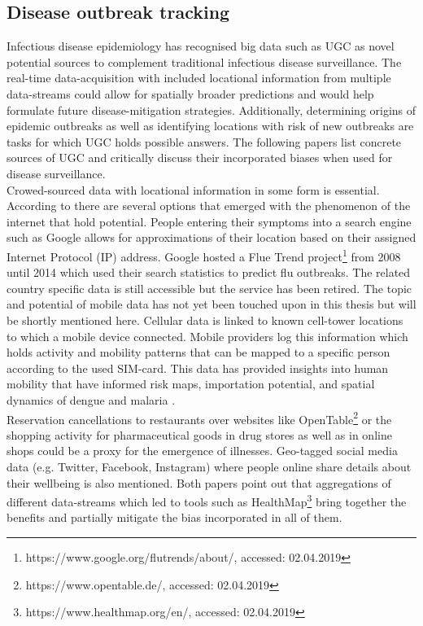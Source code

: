 \subsection{Disease outbreak tracking}
Infectious disease epidemiology has recognised big data such as UGC as novel potential sources to complement traditional infectious disease surveillance. The real-time data-acquisition with included locational information from multiple data-streams could allow for spatially broader predictions and would help formulate future disease-mitigation strategies. Additionally, determining origins of epidemic outbreaks as well as identifying locations with risk of new outbreaks are tasks for which UGC holds possible answers. The following papers list concrete sources of UGC and critically discuss their incorporated biases when used for disease surveillance.\\

Crowed-sourced data with locational information in some form is essential. According to \textcite{Lee2016, Schmidt2012} there are several options that emerged with the phenomenon of the internet that hold potential. People entering their symptoms into a search engine such as Google allows for approximations of their location based on their assigned Internet Protocol (IP) address. Google hosted a Flue Trend project\footnote{https://www.google.org/flutrends/about/, accessed: 02.04.2019} from 2008 until 2014 which used their search statistics to predict flu outbreaks. The related country specific data is still accessible but the service has been retired. The topic and potential of mobile data has not yet been touched upon in this thesis but will be shortly mentioned here. 
Cellular data is linked to known cell-tower locations to which a mobile device connected. Mobile providers log this information which holds activity and mobility patterns that can be mapped to a specific person according to the used SIM-card. This data has provided insights into human mobility that have informed risk maps, importation potential, and spatial dynamics of dengue and malaria \parencite{Buckee2015b}. \\
Reservation cancellations to restaurants over websites like OpenTable\footnote{https://www.opentable.de/, accessed: 02.04.2019} or the shopping activity for pharmaceutical goods in drug stores as well as in online shops could be a proxy for the emergence of illnesses. Geo-tagged social media data (e.g. Twitter, Facebook, Instagram) where people online share details about their wellbeing is also mentioned. Both papers point out that aggregations of different data-streams which led to tools such as HealthMap\footnote{https://www.healthmap.org/en/, accessed: 02.04.2019} bring together the benefits and partially mitigate the bias incorporated in all of them.\\

